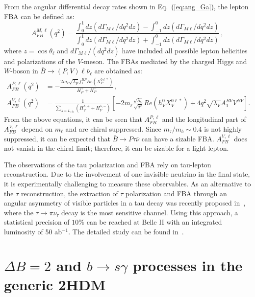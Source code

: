 \documentclass[prd,preprint,superscriptaddress,amsmath,amssymb]{revtex4}
\begin{document}
From the angular differential decay rates shown in Eq.~(\ref{eq:ang_Ga}), the lepton FBA can be defined as:
\begin{equation}
 A^{M,\ell}_{FB} (q^2) = \frac{\int^{1}_{0} dz (d\Gamma_{M\ell}/dq^2dz) - \int^{0}_{-1} dz (d\Gamma_{M\ell}/dq^2dz)}{\int^{1}_{0} dz (d\Gamma_{M\ell}/dq^2dz) + \int^{0}_{-1} dz (d\Gamma_{M\ell}/dq^2dz)}\,,
 \end{equation}
where $z=\cos\theta_\ell$ and $d\Gamma_{M\ell}/(dq^2 dz)$ have included all possible lepton helicities and polarizations of the $V$-meson. The FBAs mediated by the  charged Higgs and $W$-boson  in $\bar B \to (P, V) \ell \bar \nu_\ell$ are obtained as:
%
 \begin{align}
 A^{P,\ell}_{FB} (q^2)&=  - \frac{2 m_{\ell} \sqrt{\lambda_P} f^{BP}_1 Re(X^{0\ell *}_P)}{H^+_{P} + H^-_{P}}\,, \nonumber \\
%
  A^{V, \ell}_{FB} (q^2) &=  \frac{1}{\sum_{\lambda=L,\pm} (H^{\lambda, +}_{V} +H^{\lambda, -}_{V})} \left[ -2 m_\ell \frac{\sqrt{\lambda_{V}}}{\sqrt{q^2}}
 Re(h^0_{V} X^{0\ell *}_{V})   +4 q^2 \sqrt {\lambda_{V}} A^{BV}_1 V^{BV} \right]. \label{eq:fba}
 \end{align}
From the above equations, it can be seen that   $A^{P,\ell}_{FB}$ and the longitudinal part of $A^{V,\ell}_{FB}$  depend on $m_\ell$ and are chiral suppressed.  Since  $m_\tau/m_b \sim 0.4$  is not highly suppressed, it can be expected that   $\bar B \to P \tau \bar \nu$ can have a sizable FBA. $A^{V,\ell}_{FB}$ does not vanish in the chiral limit; therefore,  it can be sizable for a light lepton.  

 The observations of the tau polarization and FBA  rely on tau-lepton reconstruction. Due to  the involvement of one invisible neutrino in the final state, it is experimentally  challenging to measure these observables.  As an alternative to the $\tau$ reconstruction, the extraction of $\tau$ polarization and FBA through an angular asymmetry of visible particles in  a tau decay was recently proposed in~\cite{Nierste:2008qe, Alonso:2017ktd}, where  the $\tau \to \pi \nu_\tau$ decay is the most sensitive channel. Using this approach,  a statistical precision of $10\%$ can be reached at  Belle II with an integrated luminosity of 50 ab$^{-1}$. The detailed study  can be found in~\cite{Alonso:2017ktd}. 

\section{ $\Delta B=2$ and $b\to s \gamma$ processes in the generic 2HDM}
\end{document}
